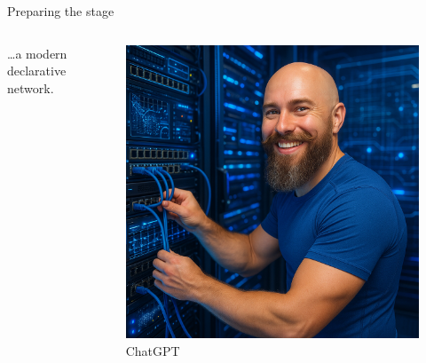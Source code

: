\documentclass[aspectratio=169]{beamer}
\begin{document}
\begin{frame}{Preparing the stage}

  \begin{columns}
    \begin{column}{0.4\textwidth}
      \dots a modern declarative network.
    \end{column}
    \begin{column}{0.4\textwidth}
      \begin{figure}
        \includegraphics[height = 0.7\textheight]{images/urs_future_network.png}
        \caption{\footnotesize ChatGPT}
      \end{figure}
    \end{column}
  \end{columns}

\end{frame}
\end{document}

